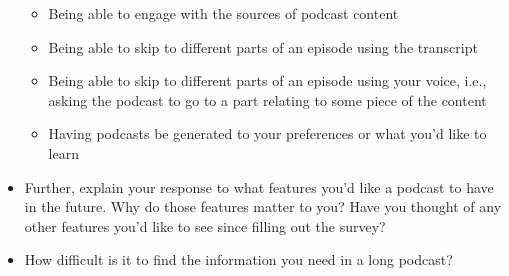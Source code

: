 \documentclass[12pt]{report}
\begin{document}
\begin{myfont}
\begin{itemize}
\begin{itemize}
            \item Being able to engage with the sources of podcast content
            \item Being able to skip to different parts of an episode using the transcript
            \item Being able to skip to different parts of an episode using your voice, i.e., asking the podcast to go to a part relating to some piece of the content
            \item Having podcasts be generated to your preferences or what you’d like to learn
          \end{itemize}
          \item Further, explain your response to what features you’d like a podcast to have in the future. Why do those features matter to you? Have you thought of any other features you’d like to see since filling out the survey?
          \item How difficult is it to find the information you need in a long podcast?
        \end{itemize}


\end{myfont}
\end{document}
